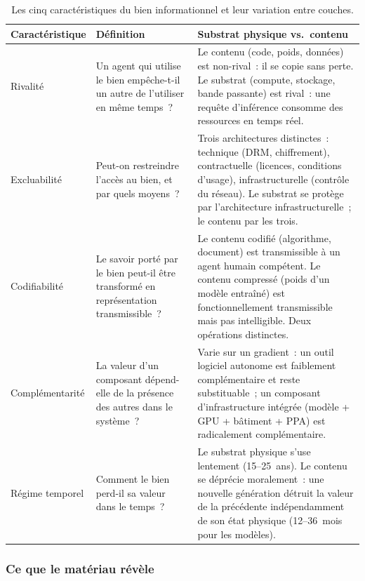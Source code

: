 \begin{table}[!ht]
\caption{Les cinq caractéristiques du bien informationnel et leur variation entre couches.}\label{tab:d1-caracteristiques}
\centering\footnotesize
\renewcommand{\arraystretch}{1.35}
\begin{tabularx}{\textwidth}{@{}p{2.2cm}p{4.5cm}X@{}}
\toprule
\textbf{Caractéristique} & \textbf{Définition} & \textbf{Substrat physique vs.\ contenu} \\
\midrule
Rivalité & Un agent qui utilise le bien empêche-t-il un autre de l'utiliser en même temps~? & Le contenu (code, poids, données) est non-rival~: il se copie sans perte. Le substrat (compute, stockage, bande passante) est rival~: une requête d'inférence consomme des ressources en temps réel. \\
Excluabilité & Peut-on restreindre l'accès au bien, et par quels moyens~? & Trois architectures distinctes~: technique (DRM, chiffrement), contractuelle (licences, conditions d'usage), infrastructurelle (contrôle du réseau). Le substrat se protège par l'architecture infrastructurelle~; le contenu par les trois. \\
Codifiabilité & Le savoir porté par le bien peut-il être transformé en représentation transmissible~? & Le contenu codifié (algorithme, document) est transmissible à un agent humain compétent. Le contenu compressé (poids d'un modèle entraîné) est fonctionnellement transmissible mais pas intelligible. Deux opérations distinctes. \\
Complémentarité & La valeur d'un composant dépend-elle de la présence des autres dans le système~? & Varie sur un gradient~: un outil logiciel autonome est faiblement complémentaire et reste substituable~; un composant d'infrastructure intégrée (modèle + GPU + bâtiment + PPA) est radicalement complémentaire. \\
Régime temporel & Comment le bien perd-il sa valeur dans le temps~? & Le substrat physique s'use lentement (15--25~ans). Le contenu se déprécie moralement~: une nouvelle génération détruit la valeur de la précédente indépendamment de son état physique (12--36~mois pour les modèles). \\
\bottomrule
\end{tabularx}
\renewcommand{\arraystretch}{1.0}
\end{table}

\subsubsection{Ce que le matériau révèle}


